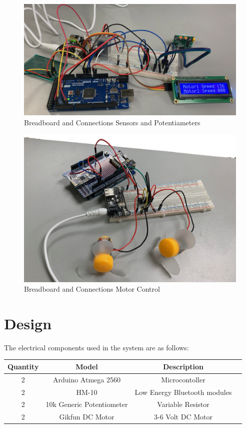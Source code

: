 \documentclass[a4paper,12pt]{article} %
\begin{document}
\begin{figure}[h]
  \center
  \includegraphics[width=\textwidth]{connectionsimage_sensors.png}
  \caption{Breadboard and Connections Sensors and Potentiameters}
  \label{fig:sensors}
\end{figure}

\begin{figure}[h]
  \center
  \includegraphics[width=\textwidth]{connectionsimage_motors.png}
  \caption{Breadboard and Connections Motor Control}
  \label{fig:motors}
\end{figure}

\section{Design}
The electrical components used in the system are as follows:
\begin{flushleft}

\begin{tabular}{cccc@{}}
\hline
Quantity  & Model & Description \\
 \hline
2  & Arduino Atmega 2560  & Microcontoller \\
2 & HM-10 & Low Energy Bluetooth modules \\
2 & 10k Generic Potentiometer & Variable Resistor \\
2  & Gikfun DC Motor & 3-6 Volt DC Motor \\
\end{tabular}
\end{flushleft}
\end{document}

